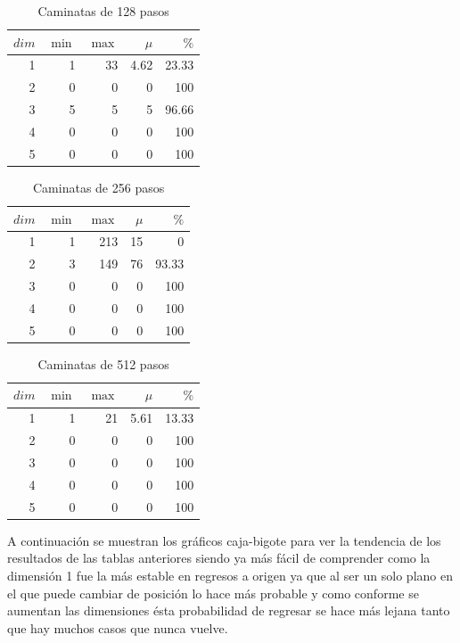 \documentclass[a4paper, 11pt]{article}
\begin{document}
    \begin{table}[H]
        \caption{Caminatas de 128 pasos}
        \bigskip
        \label{tab4}
        \centering
        \begin{tabular}{|r|rrr|r|}
        \hline
        $dim$&$\min$&$\max$&$\mu$&$\%$\\
        \hline
        1 & 1 & 33 & 4.62 & 23.33 \\
        2 & 0 & 0 & 0 & 100\\
        3 & 5 & 5 & 5 & 96.66    \\
        4 & 0 & 0 & 0 & 100    \\
        5 & 0 & 0 & 0 & 100    \\
        \hline
        \end{tabular}
    \end{table}
    \begin{table}[H]
        \caption{Caminatas de 256 pasos}
        \bigskip
        \label{tab5}
        \centering
        \begin{tabular}{|r|rrr|r|}
        \hline
        $dim$&$\min$&$\max$&$\mu$&$\%$\\
        \hline
        1 & 1 & 213 & 15 & 0 \\
        2 & 3 & 149 & 76 & 93.33\\
        3 & 0 &  0 & 0 & 100    \\
        4 & 0 &  0 & 0 & 100    \\
        5 & 0 &  0 & 0 & 100    \\
        \hline
        \end{tabular}
    \end{table}
    \begin{table}[H]
        \caption{Caminatas de 512 pasos}
        \bigskip
        \label{tab6}
        \centering
        \begin{tabular}{|r|rrr|r|}
        \hline
        $dim$&$\min$&$\max$&$\mu$&$\%$\\
        \hline
        1 & 1 & 21 & 5.61 & 13.33 \\
        2 & 0 &  0 & 0 & 100\\
        3 & 0 &  0 & 0 & 100    \\
        4 & 0 &  0 & 0 & 100    \\
        5 & 0 &  0 & 0 & 100    \\
        \hline
        \end{tabular}
    \end{table}
    

A continuación se muestran los gráficos caja-bigote para ver la tendencia de los resultados de las tablas anteriores siendo ya más fácil de comprender como la dimensión 1 fue la más estable en regresos a origen ya que al ser un solo plano en el que puede cambiar de posición lo hace más probable y como conforme se aumentan las dimensiones ésta probabilidad de regresar se hace más lejana tanto que hay muchos casos que nunca vuelve.
\end{document}
